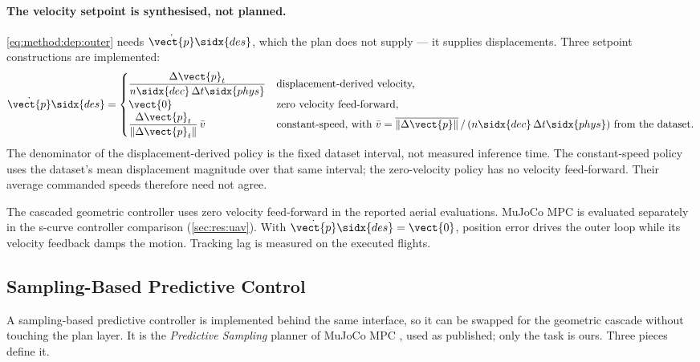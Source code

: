 \paragraph{The velocity setpoint is synthesised, not planned.} \eqref{eq:method:dep:outer} needs
$\dot{\vect{p}}\sidx{des}$, which the plan does not supply --- it supplies displacements. Three
setpoint constructions are implemented:
\begin{equation}\label{eq:method:dep:vdes}
  \dot{\vect{p}}\sidx{des} =
  \begin{cases}
    \dfrac{\Delta\vect{p}_{t}}{n\sidx{dec}\,\Delta t\sidx{phys}} & \text{displacement-derived velocity,}\\
    \vect{0} & \text{zero velocity feed-forward,}\\
    \dfrac{\Delta\vect{p}_{t}}{\|\Delta\vect{p}_{t}\|}\,\bar{v} & \text{constant-speed, with }
      \bar{v} = \overline{\|\Delta\vect{p}\|}\,/\,(n\sidx{dec}\,\Delta t\sidx{phys})\text{ from the dataset.}
  \end{cases}
\end{equation}
The denominator of the displacement-derived policy is the fixed dataset interval, not measured
inference time. The constant-speed policy uses the dataset's mean displacement magnitude over that
same interval; the zero-velocity policy has no velocity feed-forward. Their average commanded
speeds therefore need not agree.

The cascaded geometric controller uses zero velocity feed-forward in the reported aerial evaluations.
MuJoCo MPC is evaluated separately in the s-curve controller comparison
(\autoref{sec:res:uav}). With $\dot{\vect{p}}\sidx{des}=\vect{0}$, position error drives the outer
loop while its velocity feedback damps the motion. Tracking lag is measured on the executed flights.

\subsection{Sampling-Based Predictive Control}\label{sec:method:mjpc}

A sampling-based predictive controller is
implemented behind the same interface, so it can be swapped for the geometric cascade without
touching the plan layer. It is the \emph{Predictive Sampling} planner of MuJoCo MPC \parencite{howell2022predictive}, used
as published; only the task is ours. Three pieces define it.

